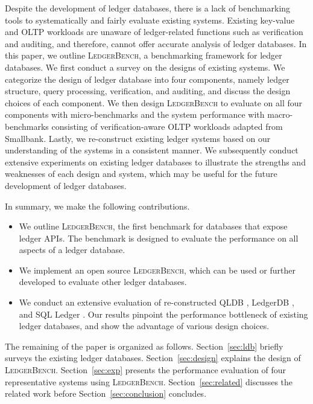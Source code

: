 \documentclass[11pt,dvipdfm]{article}
\newcommand{\systemname}{\textsc{LedgerBench}\xspace}
\begin{document}
Despite the development of ledger databases, there is a lack of benchmarking tools to systematically and fairly evaluate existing systems. 
Existing key-value and OLTP workloads are unaware of ledger-related functions such as verification and auditing, and therefore, cannot offer accurate analysis of ledger databases. 
In this paper, we outline \systemname, a benchmarking framework for ledger databases. We first conduct a survey on the designs of existing systems. 
We categorize the design of ledger database into four components, namely ledger structure, query processing, verification, and auditing, and discuss the design choices of each component. 
We then design \systemname to evaluate on all four components with micro-benchmarks and
the system performance 
with macro-benchmarks consisting of verification-aware OLTP workloads adapted from Smallbank. 
Lastly, we re-construct existing ledger systems based on our understanding of the systems in a consistent manner.
We subsequently conduct extensive experiments on existing ledger databases to illustrate the strengths and weaknesses of each design and system, which may be useful for the future development of ledger databases.

In summary, we make the following contributions.
\begin{itemize}
\item We outline \systemname, the first benchmark for databases that expose ledger APIs. The benchmark is designed to evaluate the performance on all aspects of a ledger database. 

\item We implement an open source \systemname, which can be used or further developed to evaluate other ledger databases.

\item We conduct an extensive evaluation of re-constructed QLDB \cite{qldb}, LedgerDB \cite{ledgerdb}, and SQL Ledger \cite{sqlledger}. 
Our results pinpoint the performance bottleneck of existing ledger databases, and show the advantage of various design choices.
\end{itemize}

The remaining of the paper is organized as follows. Section~\ref{sec:ldb} briefly surveys the existing ledger databases. Section~\ref{sec:design} explains the design of \systemname. Section~\ref{sec:exp} presents the performance evaluation of four representative systems using \systemname.
Section~\ref{sec:related} discusses the related work before Section~\ref{sec:conclusion} concludes.
\end{document}
